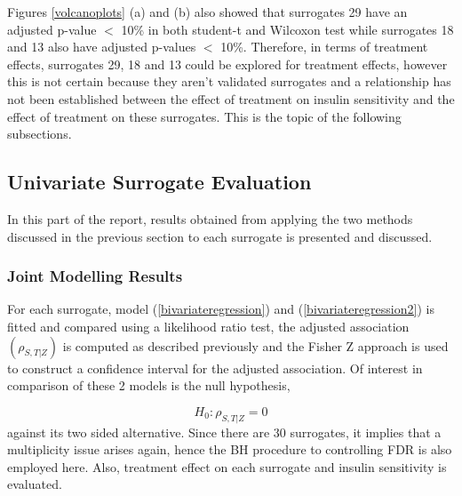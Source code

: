 \documentclass[a4paper,12pt]{article}
\begin{document}
	Figures \ref{volcanoplots} (a) and (b) also showed that surrogates 29 have an adjusted p-value $<$ 10\% in both student-t and Wilcoxon test while surrogates 18 and 13 also have adjusted p-values $<$ 10\%. Therefore, in terms of treatment effects, surrogates 29, 18 and 13 could be explored for treatment effects, however this is not certain because they aren't validated surrogates and a relationship has not been established between the effect of treatment on insulin sensitivity and the effect of treatment on these surrogates. This is the topic of the following subsections.
	
	\subsection{Univariate Surrogate Evaluation}
	In this part of the report, results obtained from applying the two methods discussed in the previous section to each surrogate is presented and discussed.
	
	\subsubsection{Joint Modelling Results}
	For each surrogate, model (\ref{bivariateregression}) and (\ref{bivariateregression2}) is fitted and compared using a likelihood ratio test, the adjusted association $(\rho_{S,T|Z})$ is computed as described previously and the Fisher Z approach is used to construct a confidence interval for the adjusted association. Of interest in comparison of these 2 models is the null hypothesis,
	
	$$H_0: \rho_{S,T | Z} = 0$$
	against its two sided alternative. Since there are 30 surrogates, it implies that a multiplicity issue arises again, hence the BH procedure to controlling FDR is also employed here.
	Also, treatment effect on each surrogate and insulin sensitivity is evaluated.
	
\end{document}
